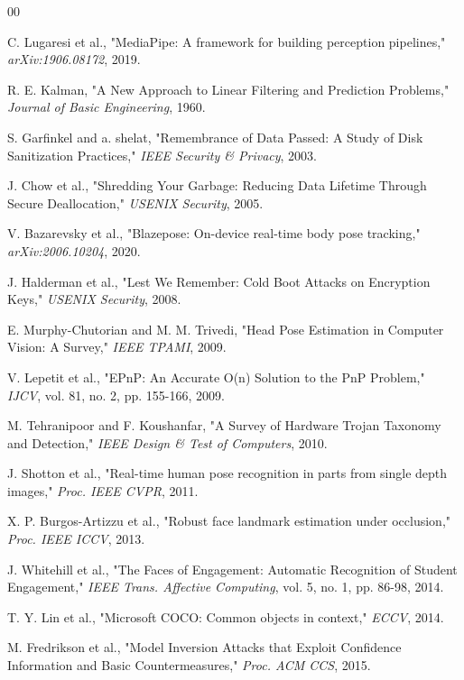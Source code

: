\documentclass[conference]{IEEEtran}
\begin{document}
\begin{thebibliography}{00}

 C. Lugaresi et al., "MediaPipe: A framework for building perception pipelines," \textit{arXiv:1906.08172}, 2019.

 R. E. Kalman, "A New Approach to Linear Filtering and Prediction Problems," \textit{Journal of Basic Engineering}, 1960.

 S. Garfinkel and a. shelat, "Remembrance of Data Passed: A Study of Disk Sanitization Practices," \textit{IEEE Security \& Privacy}, 2003.

 J. Chow et al., "Shredding Your Garbage: Reducing Data Lifetime Through Secure Deallocation," \textit{USENIX Security}, 2005.

 V. Bazarevsky et al., "Blazepose: On-device real-time body pose tracking," \textit{arXiv:2006.10204}, 2020.

 J. Halderman et al., "Lest We Remember: Cold Boot Attacks on Encryption Keys," \textit{USENIX Security}, 2008.

 E. Murphy-Chutorian and M. M. Trivedi, "Head Pose Estimation in Computer Vision: A Survey," \textit{IEEE TPAMI}, 2009.

 V. Lepetit et al., "EPnP: An Accurate O(n) Solution to the PnP Problem," \textit{IJCV}, vol. 81, no. 2, pp. 155-166, 2009.

 M. Tehranipoor and F. Koushanfar, "A Survey of Hardware Trojan Taxonomy and Detection," \textit{IEEE Design \& Test of Computers}, 2010.

 J. Shotton et al., "Real-time human pose recognition in parts from single depth images," \textit{Proc. IEEE CVPR}, 2011.

 X. P. Burgos-Artizzu et al., "Robust face landmark estimation under occlusion," \textit{Proc. IEEE ICCV}, 2013.

 J. Whitehill et al., "The Faces of Engagement: Automatic Recognition of Student Engagement," \textit{IEEE Trans. Affective Computing}, vol. 5, no. 1, pp. 86-98, 2014.

 T. Y. Lin et al., "Microsoft COCO: Common objects in context," \textit{ECCV}, 2014.

 M. Fredrikson et al., "Model Inversion Attacks that Exploit Confidence Information and Basic Countermeasures," \textit{Proc. ACM CCS}, 2015.


\end{thebibliography}
\end{document}
